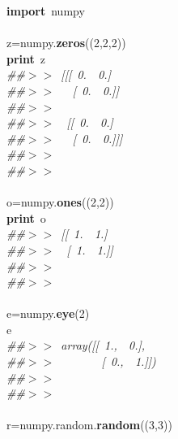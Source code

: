 \documentclass{report}
\begin{document}
\begin{minipage}{\textwidth}
{\small
\noindent
\mbox{}\textbf{import}\ numpy \\
\mbox{} \\
\mbox{}z=numpy.\textbf{zeros}((2,2,2)) \\
\mbox{}\textbf{print}\ z \\
\mbox{}\textit{\#\#$>$$>$\ [[[\ 0.\ \ 0.]} \\
\mbox{}\textit{\#\#$>$$>$\ \ \ [\ 0.\ \ 0.]]} \\
\mbox{}\textit{\#\#$>$$>$\ } \\
\mbox{}\textit{\#\#$>$$>$\ \ [[\ 0.\ \ 0.]} \\
\mbox{}\textit{\#\#$>$$>$\ \ \ [\ 0.\ \ 0.]]]} \\
\mbox{}\textit{\#\#$>$$>$\ } \\
\mbox{}\textit{\#\#$>$$>$\ } \\
\mbox{} \\
\mbox{}o=numpy.\textbf{ones}((2,2)) \\
\mbox{}\textbf{print}\ o \\
\mbox{}\textit{\#\#$>$$>$\ [[\ 1.\ \ 1.]} \\
\mbox{}\textit{\#\#$>$$>$\ \ [\ 1.\ \ 1.]]} \\
\mbox{}\textit{\#\#$>$$>$\ } \\
\mbox{}\textit{\#\#$>$$>$\ } \\
\mbox{} \\
\mbox{}e=numpy.\textbf{eye}(2) \\
\mbox{}e \\
\mbox{}\textit{\#\#$>$$>$\ array([[\ 1.,\ \ 0.],} \\
\mbox{}\textit{\#\#$>$$>$\ \ \ \ \ \ \ \ [\ 0.,\ \ 1.]])} \\
\mbox{}\textit{\#\#$>$$>$\ } \\
\mbox{}\textit{\#\#$>$$>$\ } \\
\mbox{} \\
\mbox{}r=numpy.random.\textbf{random}((3,3)) \\
\mbox{} \\
\mbox{}
}
\end{minipage}
\end{document}
